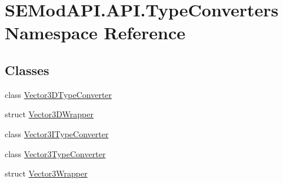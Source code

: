 \hypertarget{namespace_s_e_mod_a_p_i_1_1_a_p_i_1_1_type_converters}{}\section{S\+E\+Mod\+A\+P\+I.\+A\+P\+I.\+Type\+Converters Namespace Reference}
\label{namespace_s_e_mod_a_p_i_1_1_a_p_i_1_1_type_converters}
\subsection*{Classes}
\begin{DoxyCompactItemize}
\item 
class \hyperlink{class_s_e_mod_a_p_i_1_1_a_p_i_1_1_type_converters_1_1_vector3_d_type_converter}{Vector3\+D\+Type\+Converter}
\item 
struct \hyperlink{struct_s_e_mod_a_p_i_1_1_a_p_i_1_1_type_converters_1_1_vector3_d_wrapper}{Vector3\+D\+Wrapper}
\item 
class \hyperlink{class_s_e_mod_a_p_i_1_1_a_p_i_1_1_type_converters_1_1_vector3_i_type_converter}{Vector3\+I\+Type\+Converter}
\item 
class \hyperlink{class_s_e_mod_a_p_i_1_1_a_p_i_1_1_type_converters_1_1_vector3_type_converter}{Vector3\+Type\+Converter}
\item 
struct \hyperlink{struct_s_e_mod_a_p_i_1_1_a_p_i_1_1_type_converters_1_1_vector3_wrapper}{Vector3\+Wrapper}
\end{DoxyCompactItemize}
